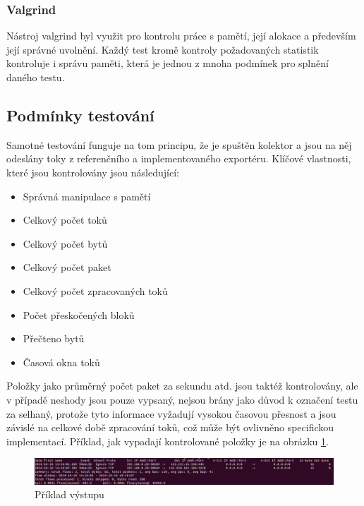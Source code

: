 \documentclass[11pt, a4paper, hidelinks]{article}[08.10.2023]
\begin{document}
    \subsubsection{Valgrind}
    Nástroj valgrind byl využit pro kontrolu práce s pamětí, její alokace a především její správné uvolnění. Každý test kromě kontroly požadovaných statistik kontroluje i správu paměti, která je jednou z mnoha podmínek pro splnění daného testu.
    \subsection{Podmínky testování}\label{test_podm}
    Samotné testování funguje na tom principu, že je spuštěn kolektor a jsou na něj odeslány toky z referenčního a implementovaného exportéru. Klíčové vlastnosti, které jsou kontrolovány jsou následující:
    \begin{itemize}
        \item{Správná manipulace s pamětí}
        \item{Celkový počet toků}
        \item{Celkový počet bytů}
        \item{Celkový počet paket}
        \item{Celkový počet zpracovaných toků}
        \item{Počet přeskočených bloků}
        \item{Přečteno bytů}
        \item{Časová okna toků}
    \end{itemize}

    Položky jako průměrný počet paket za sekundu atd. jsou taktéž kontrolovány, ale v případě neshody jsou pouze vypsaný, nejsou brány jako důvod k označení testu za selhaný, protože tyto informace vyžadují vysokou časovou přesnost a jsou závislé na celkové době zpracování toků, což může být ovlivněno specifickou implementací. Příklad, jak vypadají kontrolované položky je na obrázku \ref{test_pr}.

    \begin{figure}[H]
        \centering
        \includegraphics[width=1\linewidth]{pictures/test_pr.png}
        \caption{Příklad výstupu}
        \label{test_pr}
    \end{figure}
    
\end{document}
